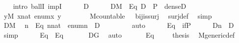 \begin{isabellebody}
\ \ \isamarkupfalse%
\ {\isacharparenleft}{\kern0pt}intro\ ballI\ impI{\isacharparenright}{\kern0pt}\isanewline
\ \ \ \ \isamarkupfalse%
\ D\isanewline
\ \ \ \ \isamarkupfalse%
\ {\isachardoublequoteopen}D{\isasymin}M{\isachardoublequoteclose}\ \ Eq{}{\isacharcolon}{\kern0pt}\ {\isachardoublequoteopen}D\ {\isasymsubseteq}\ P\ {\isasymand}\ dense{\isacharparenleft}{\kern0pt}D{\isacharparenright}{\kern0pt}\ {\isachardoublequoteclose}\ \isanewline
\ \ \ \ \isamarkupfalse%
\ {\isachardoublequoteopen}{\isasymforall}y{\isasymin}M{\isachardot}{\kern0pt}\ {\isasymexists}x{\isasymin}nat{\isachardot}{\kern0pt}\ enum{\isacharbackquote}{\kern0pt}x{\isacharequal}{\kern0pt}\ y{\isachardoublequoteclose}\isanewline
\ \ \ \ \ \ \isamarkupfalse%
\ M{\isacharunderscore}{\kern0pt}countable\ \ \ bij{\isacharunderscore}{\kern0pt}is{\isacharunderscore}{\kern0pt}surj\ \isamarkupfalse%
\ surj{\isacharunderscore}{\kern0pt}def\ \isamarkupfalse%
\ {\isacharparenleft}{\kern0pt}simp{\isacharparenright}{\kern0pt}\isanewline
\ \ \ \ \isamarkupfalse%
\ {\isacartoucheopen}D{\isasymin}M{\isacartoucheclose}\ \isamarkupfalse%
\ n\ \ Eq{}{}{\isacharcolon}{\kern0pt}\ {\isachardoublequoteopen}n{\isasymin}nat\ {\isasymand}\ enum{\isacharbackquote}{\kern0pt}n\ {\isacharequal}{\kern0pt}\ D{\isachardoublequoteclose}\ \isanewline
\ \ \ \ \ \ \isamarkupfalse%
\ auto\isanewline
\ \ \ \ \isamarkupfalse%
\ Eq{}\ \ if{\isacharunderscore}{\kern0pt}P\isanewline
\ \ \ \ \isamarkupfalse%
\ {\isachardoublequoteopen}{\isacharquery}{\kern0pt}D{\isacharbackquote}{\kern0pt}n\ {\isacharequal}{\kern0pt}\ D{\isachardoublequoteclose}\ \isamarkupfalse%
\ {\isacharparenleft}{\kern0pt}simp{\isacharparenright}{\kern0pt}\isanewline
\ \ \ \ \isamarkupfalse%
\ Eq{}\ \ Eq{}{}\ \isanewline
\ \ \ \ \isamarkupfalse%
\ {\isachardoublequoteopen}D{\isasyminter}G{\isasymnoteq}{}{\isachardoublequoteclose}\ \isamarkupfalse%
\ auto\isanewline
\ \ \isamarkupfalse%
\isanewline
\ \ \isamarkupfalse%
\ Eq{}\ \isanewline
\ \ \isamarkupfalse%
\ {\isacharquery}{\kern0pt}thesis\ \isamarkupfalse%
\ M{\isacharunderscore}{\kern0pt}generic{\isacharunderscore}{\kern0pt}def\ \isamarkupfalse%

\end{isabellebody}
